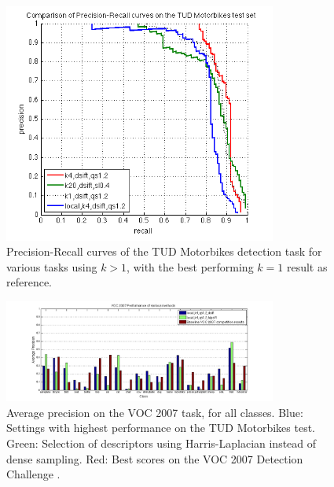 \begin{figure}[hbt]
    \centering
    \includegraphics[width=0.8\textwidth]{TUD_local}
    \caption{Precision-Recall curves of the TUD Motorbikes detection task for various tasks using $k>1$, with the best performing $k=1$ result as reference.}
    \label{fig:tudlocalprecrec}
\end{figure}
\begin{figure}[hbt]
    \centering
    \includegraphics[width=0.8\textwidth]{VOC_aps}
    \caption{Average precision on the VOC 2007 task, for all classes. Blue: Settings with highest performance on the TUD Motorbikes test. Green: Selection of descriptors using Harris-Laplacian instead of dense sampling. Red: Best scores on the VOC 2007 Detection Challenge \cite{pascal-voc-2007}.}
    \label{fig:voclocalaps}
\end{figure}

